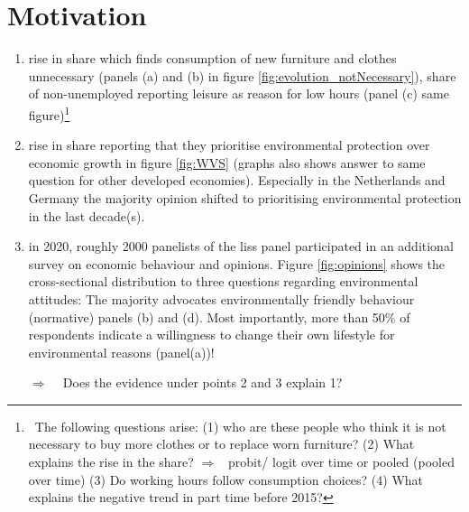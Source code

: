 \documentclass[12pt]{article}
\newcommand{\ar}{$\Rightarrow$ \ }
\begin{document}
\section{Motivation}
\begin{enumerate}
	\item rise in share which finds consumption of new furniture and clothes unnecessary (panels (a) and (b) in figure \ref{fig:evolution_notNecessary}), share of non-unemployed reporting leisure as reason for low hours (panel (c) same figure)\footnote{\ The following questions arise: 
		(1) who are these people who think it is not necessary to buy more clothes or to replace worn furniture?
		(2) What explains the rise in the share? \ar probit/ logit over time or pooled (pooled over time)
		(3) Do working hours follow consumption choices? 
		(4) What explains the negative trend in part time before 2015? 
	}
	\item rise in share reporting that  they prioritise environmental protection over economic growth in figure \ref{fig:WVS} (graphs also shows answer to same question for other developed economies). Especially in the Netherlands and Germany the majority opinion shifted to prioritising environmental protection in the last decade(s).
	\item in 2020,  roughly 2000 panelists of the liss panel participated in an additional survey on economic behaviour and opinions. Figure \ref{fig:opinions} shows the cross-sectional distribution to three questions regarding environmental attitudes: The majority advocates environmentally friendly behaviour (normative) panels (b) and (d). Most importantly, more than 50\% of respondents indicate a willingness to change their own lifestyle for environmental reasons (panel(a))!
	\item[\ar] Does the evidence under points 2 and 3 explain 1?
\end{enumerate}

\end{document}

